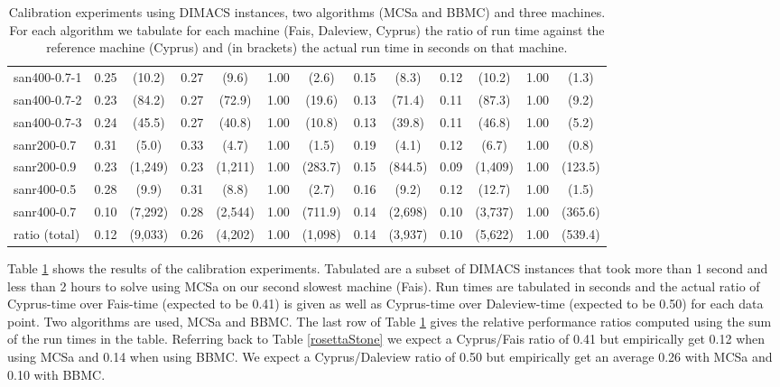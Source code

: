\documentclass[runningheads]{llncs}
\begin{document}
\begin{table}
\begin{center}
\begin{scriptsize}
\begin{tabular}{|l|c c|c c|c c|c c|c c|c c|}
san400-0.7-1 & 0.25 & (10.2) & 0.27 & (9.6) & 1.00 & (2.6) & 0.15 & (8.3) & 0.12 & (10.2) & 1.00 & (1.3) \\ 
san400-0.7-2 & 0.23 & (84.2) & 0.27 & (72.9) & 1.00 & (19.6) & 0.13 & (71.4) & 0.11 & (87.3) & 1.00 & (9.2) \\ 
san400-0.7-3 & 0.24 & (45.5) & 0.27 & (40.8) & 1.00 & (10.8) & 0.13 & (39.8) & 0.11 & (46.8) & 1.00 & (5.2) \\ 
sanr200-0.7 & 0.31 & (5.0) & 0.33 & (4.7) & 1.00 & (1.5) & 0.19 & (4.1) & 0.12 & (6.7) & 1.00 & (0.8) \\ 
sanr200-0.9 & 0.23 & (1,249) & 0.23 & (1,211) & 1.00 & (283.7) & 0.15 & (844.5) & 0.09 & (1,409) & 1.00 & (123.5) \\
sanr400-0.5 & 0.28 & (9.9) & 0.31 & (8.8) & 1.00 & (2.7) & 0.16 & (9.2) & 0.12 & (12.7) & 1.00 & (1.5) \\ 
sanr400-0.7 & 0.10 & (7,292) & 0.28 & (2,544) & 1.00 & (711.9) & 0.14 & (2,698) & 0.10 & (3,737) & 1.00 & (365.6) \\ \hline
ratio (total)    & 0.12 & (9,033) & 0.26 & (4,202) & 1.00 & (1,098) & 0.14 & (3,937) & 0.10 & (5,622) & 1.00 & (539.4) \\ \hline
\end{tabular}
\end{scriptsize}
\end{center}
\caption{Calibration experiments using DIMACS instances, two algorithms (MCSa and BBMC) and three machines. For each algorithm
we tabulate for each machine (Fais, Daleview, Cyprus) the ratio of run time against the reference machine (Cyprus) and
(in brackets) the actual run time in seconds on that machine.}
\label{calibration}
\end{table}

Table \ref{calibration} shows the results of the calibration experiments. Tabulated are a subset of DIMACS instances that
took more than 1 second and less than 2 hours to solve using MCSa on our second slowest machine (Fais). Run times are tabulated in
seconds and the actual ratio of Cyprus-time over Fais-time (expected to be 0.41) is given as well as Cyprus-time over
Daleview-time (expected to be 0.50) for each data point. Two algorithms are used, MCSa and BBMC. The last row of
Table \ref{calibration} gives the 
relative performance ratios computed using the sum of the run times in the table. Referring back to Table \ref{rosettaStone} we expect a 
Cyprus/Fais ratio of 0.41 but empirically get
0.12 when using MCSa and 0.14 when using BBMC. We expect a Cyprus/Daleview ratio of 0.50 but empirically
get an average 0.26 with MCSa and 0.10 with BBMC. 
\end{document}
